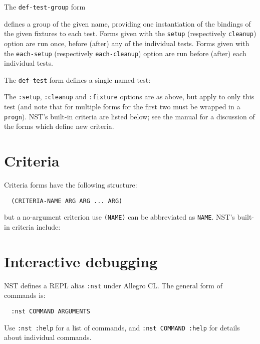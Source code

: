 \documentclass{article}
\newenvironment{criteria}%
{\begin{list}{}
    {\setlength{\labelwidth}{0pt}
     \setlength{\leftmargin}{2em}
     \setlength{\rightmargin}{1em}
     \setlength{\itemindent}{0em}}}%
  {\end{list}}
\def\criterion#1#2#3#4{\item[\bfseries #1] #4\par
  \emph{Syntax:}~~\texttt{#2}\\ \emph{Applicable to:}~~#3}
\begin{document}
The \texttt{def-test-group} form 

defines a group of the given name, providing one instantiation of the
bindings of the given fixtures to each test.  Forms given with the
\texttt{setup} (respectively \texttt{cleanup}) option are run once,
before (after) any of the individual tests.  Forms given with the
\texttt{each-setup} (respectively \texttt{each-cleanup}) option are
run before (after) each individual tests.

The \texttt{def-test} form defines a single named test:

The \texttt{:setup}, \texttt{:cleanup} and \texttt{:fixture} options
are as above, but apply to only this test (and note that for multiple
forms for the first two must be wrapped in a \texttt{progn}).  NST's
built-in criteria are listed below; see the manual for a discussion of
the forms which define new criteria.

\section*{Criteria}
Criteria forms have the following structure:
\begin{verbatim}
  (CRITERIA-NAME ARG ARG ... ARG)
\end{verbatim}
but a no-argument criterion use \texttt{(NAME)} can be abbreviated as
\texttt{NAME}.  NST's built-in criteria include:
\def\criteriaGroup#1#2{\par\textbf{#1.}\begin{criteria}}
\def\secText#1{}
\def\endcriteriaGroup{\end{criteria}}
\def\criteriaDoc#1#2#3#4#5#6#7#8{\criterion{#2}{#3}{#5}{#4}}
\def\noExpl{}
\def\hasExpl#1{}
\def\manualOrRef#1#2{#2}


\section*{Interactive debugging}
NST defines a REPL alias \texttt{:nst} under Allegro CL.  The general
form of commands is:
\begin{verbatim}
  :nst COMMAND ARGUMENTS
\end{verbatim}
Use \mbox{\texttt{:nst :help}} for a list of commands, and
\mbox{\texttt{:nst COMMAND :help}} for details about individual
commands.
\end{document}
